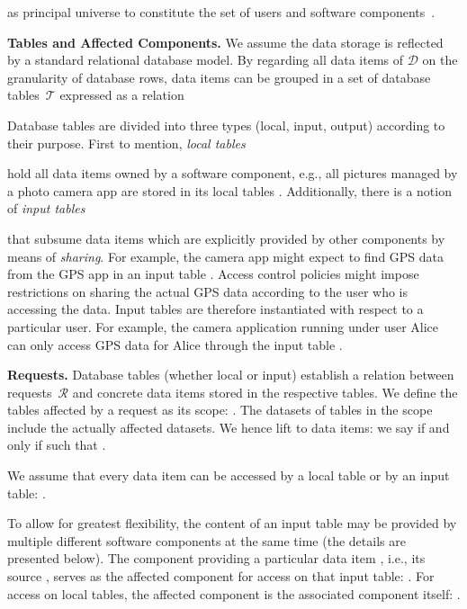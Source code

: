 \documentclass{src/acm_proc_article-sp} \else
\newcommand\myparagraph[1]{\medskip\noindent\textbf{#1.}}
\newcommand\cD{\ensuremath{\mathcal{D}}\xspace}
\newcommand\cT{\ensuremath{\mathcal{T}}\xspace}
\newcommand\cR{\ensuremath{\mathcal{R}}\xspace}
\begin{document}
as principal universe to constitute the set of users  and
software components~.


\myparagraph{Tables and Affected Components}
We assume the data storage  is reflected by a standard
relational database model. By regarding all data items of
\cD on the granularity of database rows, data items can be
grouped in a set of database tables~\cT expressed as a
relation

Database tables are divided into three types (local,
input, output) according to their purpose.
First to mention,
\emph{local tables}

hold all data items owned by a software component, e.g., all
pictures managed by a photo camera app  are
stored in its local tables .
Additionally, there is a notion of \emph{input tables}

that subsume data items
which are explicitly provided by other components by means
of \emph{sharing}. For example, the camera app might expect
to find GPS data from the GPS app in an input table
.
Access control policies might impose restrictions on sharing
the actual GPS data according to the user who is accessing
the data. Input tables are therefore instantiated with
respect to a particular user. For example, the camera
application running under user Alice can only access GPS
data for Alice through the input table .



\myparagraph{Requests}
Database tables (whether local or input) establish a
relation between requests~\cR and concrete data items 
stored in the respective tables. We define the tables
affected by a request as its scope:
.
The datasets of tables in the scope include the actually
affected datasets. We hence lift  to data
items: we say  if and only if
 such that .

We assume that every data item can be accessed by a local
table or by an input table:
.



To allow for greatest
flexibility, the content of an input table  may be provided by multiple
different software components at the same time (the details
are presented below). The component providing a particular
data item , i.e., its source
, serves as the
affected component for access on that input table:
.
For access on local tables, the affected component is the
associated component  itself:
.
\end{document}
